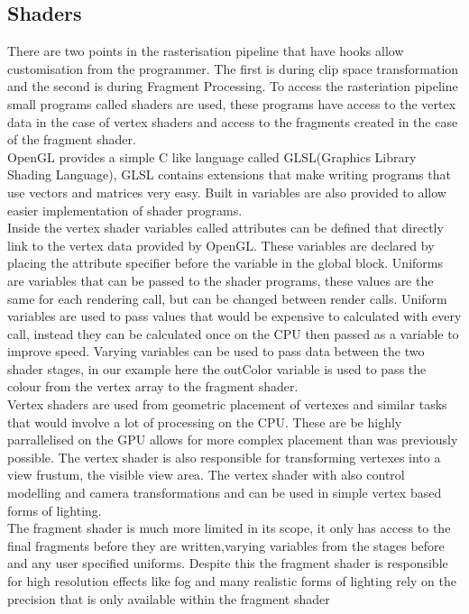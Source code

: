 \subsection{Shaders}
There are two points in the rasterisation pipeline that have hooks allow 
customisation from the programmer. The first is during clip space transformation
and the second is during Fragment Processing. To access the rasteriation pipeline
small programs called shaders are used, these programs have access to the
vertex data in the case of vertex shaders and access to the fragments created in
the case of the fragment shader.\\

OpenGL provides a simple C like language called GLSL(Graphics Library Shading 
Language), GLSL contains extensions that make writing programs that use vectors
and matrices very easy. Built in variables are also provided to allow easier
implementation of shader programs. \\



Inside the vertex shader variables called attributes can be defined that directly
link to the vertex data provided by OpenGL. These variables are declared by 
placing the attribute specifier before the variable in the global block.
Uniforms are variables that can be passed to the shader programs, 
these values are the 
same for each rendering call, but can be changed between render calls. Uniform
variables are used to pass values that would be expensive to calculated with every
call, instead they can be calculated once on the CPU then passed as a variable to
improve speed. Varying variables can be used to pass data between the two shader 
stages, in our example here the outColor variable is used to pass the colour from the
vertex array to the fragment shader.\\

Vertex shaders are used from geometric placement of vertexes and similar tasks
that would involve a lot of processing on the CPU. These are be highly 
parrallelised on the GPU allows for more complex placement than was previously
possible. The vertex shader is also responsible for transforming vertexes into
a view frustum, the visible view area. The vertex shader with also control 
modelling and camera transformations and can be used in simple vertex based forms
of lighting.\\

The fragment shader is much more limited in its scope, it only has access to the
final fragments before they are written,varying variables from the stages before and
any user specified uniforms. Despite
this the fragment shader is responsible for high resolution effects like fog and
many realistic forms of lighting rely on the precision that is only available
within the fragment shader\\

